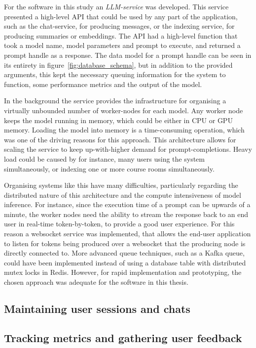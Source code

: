 For the software in this study an \textit{LLM-service} was developed. This service presented a high-level API that could be used by any part of the application, such as the chat-service, for producing messages, or the indexing service, for producing summaries or embeddings. The API had a high-level function that took a model name, model parameters and prompt to execute, and returned a prompt handle as a response. The data model for a prompt handle can be seen in its entirety in figure~\ref{fig:database_schema}, but in addition to the provided arguments, this kept the necessary queuing information for the system to function, some performance metrics and the output of the model.


In the background the service provides the infrastructure for organising a virtually unbounded number of worker-nodes for each model. Any worker node keeps the model running in memory, which could be either in CPU or GPU memory. Loading the model into memory is a time-consuming operation, which was one of the driving reasons for this approach. This architecture allows for scaling the service to keep up-with-higher demand for prompt-completions. Heavy load could be caused by for instance, many users using the system simultaneously, or indexing one or more course rooms simultaneously.


Organising systems like this have many difficulties, particularly regarding the distributed nature of this architecture and the compute intensiveness of model inference. For instance, since the execution time of a prompt can be upwards of a minute, the worker nodes need the ability to stream the response back to an end user in real-time token-by-token, to provide a good user experience. For this reason a websocket service was implemented, that allows the end-user application to listen for tokens being produced over a websocket that the producing node is directly connected to. More advanced queue techniques, such as a Kafka queue, could have been implemented instead of using a database table with distributed mutex locks in Redis. However, for rapid implementation and prototyping, the chosen approach was adequate for the software in this thesis.
\subsection{Maintaining user sessions and chats}


\subsection{Tracking metrics and gathering user feedback}


